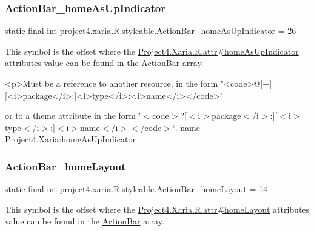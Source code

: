 \subsubsection{\texorpdfstring{Action\+Bar\+\_\+home\+As\+Up\+Indicator}{ActionBar\_homeAsUpIndicator}}
{\footnotesize\ttfamily static final int project4.\+xaria.\+R.\+styleable.\+Action\+Bar\+\_\+home\+As\+Up\+Indicator = 26\hspace{0.3cm}{\ttfamily [static]}}

This symbol is the offset where the \hyperlink{}{Project4.\+Xaria.\+R.\+attr\#home\+As\+Up\+Indicator} attribute\textquotesingle{}s value can be found in the \hyperlink{classproject4_1_1xaria_1_1R_1_1styleable_accb530194c58ee3abb15587da8869e99}{Action\+Bar} array.

\begin{DoxyVerb}      <p>Must be a reference to another resource, in the form "<code>@[+][<i>package</i>:]<i>type</i>:<i>name</i></code>"
\end{DoxyVerb}
 or to a theme attribute in the form \char`\"{}$<$code$>$?\mbox{[}$<$i$>$package$<$/i$>$\+:\mbox{]}\mbox{[}$<$i$>$type$<$/i$>$\+:\mbox{]}$<$i$>$name$<$/i$>$$<$/code$>$\char`\"{}.  name Project4.\+Xaria\+:home\+As\+Up\+Indicator \mbox{\label{classproject4_1_1xaria_1_1R_1_1styleable_a3c2746f97e4f1d93ae4fd7b0a94e055c}} 
\subsubsection{\texorpdfstring{Action\+Bar\+\_\+home\+Layout}{ActionBar\_homeLayout}}
{\footnotesize\ttfamily static final int project4.\+xaria.\+R.\+styleable.\+Action\+Bar\+\_\+home\+Layout = 14\hspace{0.3cm}{\ttfamily [static]}}

This symbol is the offset where the \hyperlink{}{Project4.\+Xaria.\+R.\+attr\#home\+Layout} attribute\textquotesingle{}s value can be found in the \hyperlink{classproject4_1_1xaria_1_1R_1_1styleable_accb530194c58ee3abb15587da8869e99}{Action\+Bar} array.

